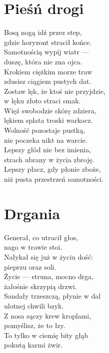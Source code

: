\documentclass[12pt, a4paper]{memoir}
\renewenvironment{verse}{%
  \par\vspace{\baselineskip}\raggedright
}{
  \par\vspace{\baselineskip}
}
\begin{document}
\clearpage

\section{Pieśń drogi}
\begin{verse}
Bosą nogą idź przez step,\\
gdzie horyzont stracił końce.\\
Samotnością wypij wiatr ---\\
duszę, która nie zna ojca.\\[\baselineskip]

Krokiem ciężkim morze traw\\
zdusisz ciągiem pustych dat.\\
Zostaw lęk, że ktoś nie przyjdzie,\\
w lęku złoto straci smak.\\[\baselineskip]

Więź swobodzie skórę zdziera,\\
lękiem splata troski warkocz.\\
Wolność pozostaje pustką,\\
nie poczeka nikt na warcie.\\[\baselineskip]

Lepszy głód nie bez imienia,\\
strach ubrany w życia zbroję.\\
Lepszy płacz, gdy płonie zboże,\\
niż pusta przestrzeń samotności.
\end{verse}

\clearpage

\section{Drgania}
\begin{verse}
Generał, co utracił głos,\\
nago w trawie stoi.\\
Nałykał się już w życiu dość:\\
pieprzu oraz soli.\\[\baselineskip]

Życie --- struna, mocno drga,\\
żałośnie skrzypią drzwi.\\
Sandały trzeszczą, płynie w dal\\
ulotnej chwili bzyk.\\[\baselineskip]

Z nosa sączy krew kroplami,\\
pomyślisz, że to łzy.\\
To tylko w ciemię bity głąb\\
pokutą karmi żwir.
\end{verse}
\end{document}
